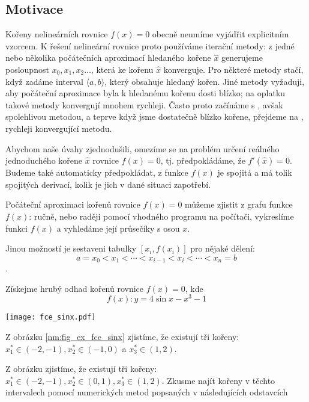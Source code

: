 {    \subsection{Motivace}
      Kořeny nelineárních rovnice $f(x)=0$ obecně neumíme vyjádřit explicitním vzorcem. K řešení
      nelineární rovnice proto používáme iterační metody: z jedné nebo několika počátečních
      aproximací hledaného kořene $\hat{x}$ generujeme posloupnost $x_0,x_1,x_2…$, která ke kořenu
      $\hat{x}$ konverguje. Pro některé metody stačí, když zadáme interval $\langle a,b\rangle$,
      který obsahuje hledaný kořen. Jiné metody vyžaduji, aby počáteční aproximace byla k hledanému
      kořenu dosti blízko; na oplatku takové metody konvergují mnohem rychleji. Často proto začínáme
      s , avšak spolehlivou metodou, a teprve když jsme dostatečně blízko kořene, 
      přejdeme na , rychleji konvergující metodu.
  
      Abychom naše úvahy zjednodušili, omezíme se na problém určení re\-ál\-né\-ho
      je\-dno\-du\-ché\-ho kořene $\hat{x}$ rovnice $f(x)=0$, tj. předpokládáme, že $f'(\hat{x})=0$.
      Budeme také automaticky předpokládat, z funkce $f(x)$ je spojitá a má tolik spojitých 
      derivací, kolik je jich v dané situaci zapotřebí.
  
      Počáteční aproximaci kořenů rovnice $f(x)=0$ můžeme zjistit z grafu funkce $f(x)$: ručně, nebo
      raději pomocí vhodného programu na počítači, vykreslíme funkci $f(x)$ a vyhledáme její
      průsečíky s osou $x$.
  
      Jinou možností je sestaveni tabulky $[x_i,f(x_i)]$ pro nějaké dělení:
      $$a=x_0<x_1<\cdots<x_{i-1}<x_i<\cdots<x_n=b$$.
      \begin{example} Získejme hrubý odhad kořenů rovnice $f(x) = 0$, kde $$f(x):y=4\sin x - x^3 - 
      1$$

          {\centering
           \captionsetup{type=figure}
           \texttt{[image: fce\_sinx.pdf]}
           \label{nm:fig_ex_fce_sinx}
           \par}
        Z obrázku \ref{nm:fig_ex_fce_sinx} zjistíme, že existují tři kořeny: $x_1^*\in(-2,-1),
        x_2^*\in(-1, 0)$ a $x_3^*\in(1, 2)$.
      \end{example}
  
      Z obrázku zjistíme, že existují tři kořeny: $x_1^*\in(-2,-1),x_2^*\in(0,1),x_3^*\in(1,2)$.
      Zkusme najít kořeny v těchto intervalech pomocí numerických metod popsaných v následujících
      odstavcích
  
}
